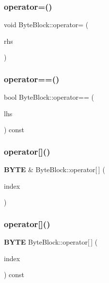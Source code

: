 \mbox{\label{class_byte_block_af34224909c38e21d94d5c869599516ff}} 
\subsubsection{operator=()}
{\footnotesize\ttfamily void Byte\+Block\+::operator= (\begin{DoxyParamCaption}\item[{\textbf{ Byte\+Block} \&\&}]{rhs }\end{DoxyParamCaption})}

\mbox{\label{class_byte_block_a08193b9eb12da9889420f95bee6ce610}} 
\subsubsection{operator==()}
{\footnotesize\ttfamily bool Byte\+Block\+::operator== (\begin{DoxyParamCaption}\item[{const \textbf{ Byte\+Block} \&}]{lhs }\end{DoxyParamCaption}) const}

\mbox{\label{class_byte_block_a512ce89c574508343ed1c80c7422ae71}} 
\subsubsection{operator[]()\hspace{0.1cm}{\footnotesize\ttfamily [1/2]}}
{\footnotesize\ttfamily \textbf{ B\+Y\+TE} \& Byte\+Block\+::operator[$\,$] (\begin{DoxyParamCaption}\item[{size\+\_\+t}]{index }\end{DoxyParamCaption})}

\mbox{\label{class_byte_block_a1188eeaf7da2316bdca468ea91727cd2}} 
\subsubsection{operator[]()\hspace{0.1cm}{\footnotesize\ttfamily [2/2]}}
{\footnotesize\ttfamily \textbf{ B\+Y\+TE} Byte\+Block\+::operator[$\,$] (\begin{DoxyParamCaption}\item[{size\+\_\+t}]{index }\end{DoxyParamCaption}) const}

